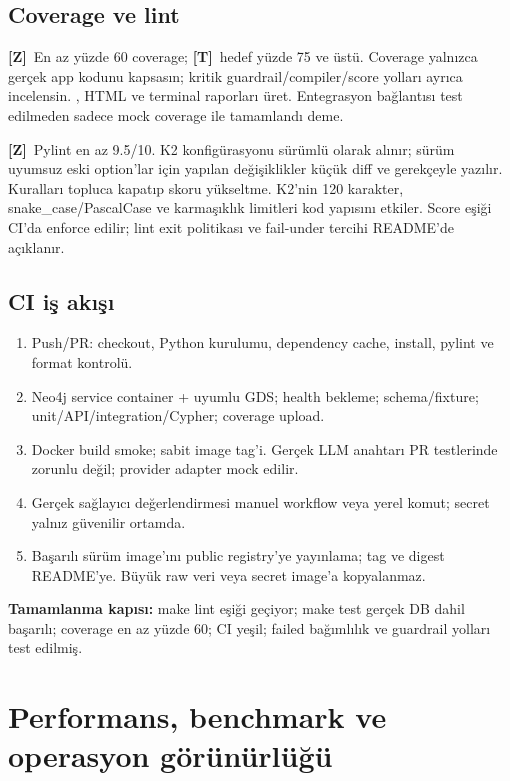\documentclass[11pt,a4paper]{article}
\newcommand{\code}[1]{\texttt{\detokenize{#1}}}
\newcommand{\must}{\textbf{[Z]}}
\newcommand{\design}{\textbf{[T]}}
\newcommand{\gate}[1]{\par\smallskip\noindent\colorbox{pale}{\parbox{0.96\linewidth}{\textbf{Tamamlanma kapısı:} #1}}\par\smallskip}
\begin{document}
\subsection{Coverage ve lint}
\must\ En az yüzde 60 coverage; \design\ hedef yüzde 75 ve üstü. Coverage yalnızca gerçek app kodunu kapsasın; kritik guardrail/compiler/score yolları ayrıca incelensin. \code{--cov-report=xml}, HTML ve terminal raporları üret. Entegrasyon bağlantısı test edilmeden sadece mock coverage ile tamamlandı deme.

\must\ Pylint en az 9.5/10. K2 konfigürasyonu sürümlü olarak alınır; sürüm uyumsuz eski option'lar için yapılan değişiklikler küçük diff ve gerekçeyle yazılır. Kuralları topluca kapatıp skoru yükseltme. K2'nin 120 karakter, snake\_case/PascalCase ve karmaşıklık limitleri kod yapısını etkiler. Score eşiği CI'da enforce edilir; lint exit politikası ve fail-under tercihi README'de açıklanır.

\subsection{CI iş akışı}
\begin{enumerate}
\item Push/PR: checkout, Python kurulumu, dependency cache, install, pylint ve format kontrolü.
\item Neo4j service container + uyumlu GDS; health bekleme; schema/fixture; unit/API/integration/Cypher; coverage upload.
\item Docker build smoke; sabit image tag'i. Gerçek LLM anahtarı PR testlerinde zorunlu değil; provider adapter mock edilir.
\item Gerçek sağlayıcı değerlendirmesi manuel workflow veya yerel komut; secret yalnız güvenilir ortamda.
\item Başarılı sürüm image'ını public registry'ye yayınlama; tag ve digest README'ye. Büyük raw veri veya secret image'a kopyalanmaz.
\end{enumerate}

\gate{make lint eşiği geçiyor; make test gerçek DB dahil başarılı; coverage en az yüzde 60; CI yeşil; failed bağımlılık ve guardrail yolları test edilmiş.}

\section{Performans, benchmark ve operasyon görünürlüğü}
\end{document}
